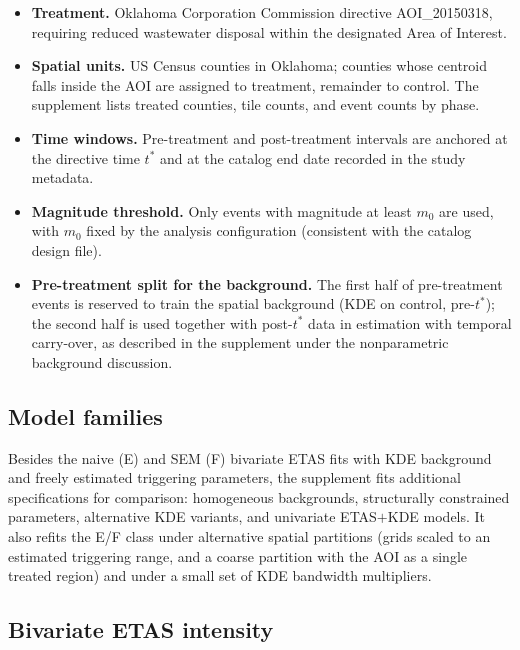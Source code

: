 \begin{itemize}
  \item \textbf{Treatment.} Oklahoma Corporation Commission directive AOI\_20150318, requiring reduced wastewater disposal within the designated Area of Interest.
  \item \textbf{Spatial units.} US Census counties in Oklahoma; counties whose centroid falls inside the AOI are assigned to treatment, remainder to control. The supplement lists treated counties, tile counts, and event counts by phase.
  \item \textbf{Time windows.} Pre-treatment and post-treatment intervals are anchored at the directive time $t^*$ and at the catalog end date recorded in the study metadata.
  \item \textbf{Magnitude threshold.} Only events with magnitude at least $m_0$ are used, with $m_0$ fixed by the analysis configuration (consistent with the catalog design file).
  \item \textbf{Pre-treatment split for the background.} The first half of pre-treatment events is reserved to train the spatial background (KDE on control, pre-$t^*$); the second half is used together with post-$t^*$ data in estimation with temporal carry-over, as described in the supplement under the nonparametric background discussion.
\end{itemize}

\subsection{Model families}

Besides the naive (E) and SEM (F) bivariate ETAS fits with KDE background and freely estimated triggering parameters, the supplement fits additional specifications for comparison: homogeneous backgrounds, structurally constrained parameters, alternative KDE variants, and univariate ETAS$+$KDE models. It also refits the E/F class under alternative spatial partitions (grids scaled to an estimated triggering range, and a coarse partition with the AOI as a single treated region) and under a small set of KDE bandwidth multipliers.

\subsection{Bivariate ETAS intensity}

